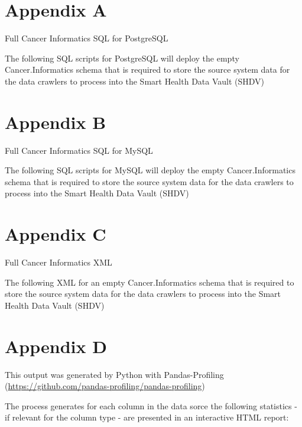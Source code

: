\chapter{Appendix A}
\label{text:appendixa}

Full Cancer Informatics SQL for PostgreSQL

The following SQL scripts for PostgreSQL will deploy the empty Cancer.Informatics schema that is required to store the source system data for the data crawlers to process into the Smart Health Data Vault (SHDV)



\chapter{Appendix B}
\label{text:appendixb}

Full Cancer Informatics SQL for MySQL

The following SQL scripts for MySQL will deploy the empty Cancer.Informatics schema that is required to store the source system data for the data crawlers to process into the Smart Health Data Vault (SHDV)



\chapter{Appendix C}
\label{text:appendixc}

Full Cancer Informatics XML

The following XML for an  empty Cancer.Informatics schema that is required to store the source system data for the data crawlers to process into the Smart Health Data Vault (SHDV)



\chapter{Appendix D}
\label{text:appendixd}

This output was generated by Python with Pandas-Profiling (\url{https://github.com/pandas-profiling/pandas-profiling})

The process generates for each column in the data sorce the following statistics - if relevant for the column type - are presented in an interactive HTML report:

